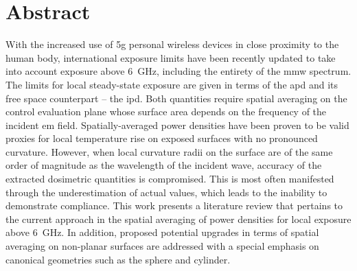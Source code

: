 \chapter*{Abstract}

With the increased use of \gls{5g} personal wireless devices in close proximity to the human body, international exposure limits have been recently updated to take into account exposure above \SI{6}{\GHz}, including the entirety of the \gls{mmw} spectrum.
The limits for local steady-state exposure are given in terms of the \gls{apd} and its free space counterpart -- the \gls{ipd}.
Both quantities require spatial averaging on the control evaluation plane whose surface area depends on the frequency of the incident \gls{em} field.
Spatially-averaged power densities have been proven to be valid proxies for local temperature rise on exposed surfaces with no pronounced curvature.
However, when local curvature radii on the surface are of the same order of magnitude as the wavelength of the incident wave, accuracy of the extracted dosimetric quantities is compromised.
This is most often manifested through the underestimation of actual values, which leads to the inability to demonstrate compliance.
This work presents a literature review that pertains to the current approach in the spatial averaging of power densities for local exposure above \SI{6}{\GHz}.
In addition, proposed potential upgrades in terms of spatial averaging on non-planar surfaces are addressed with a special emphasis on canonical geometries such as the sphere and cylinder.